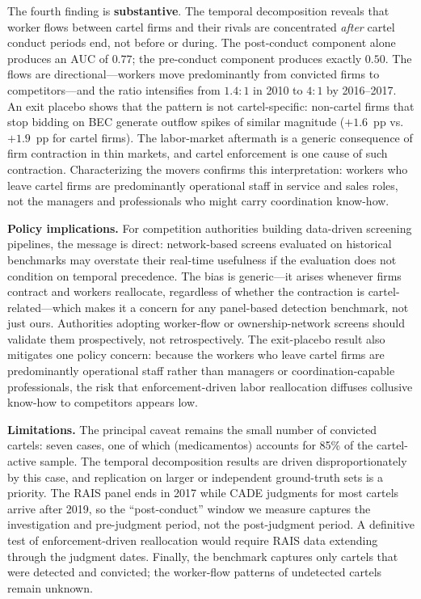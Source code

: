 The fourth finding is \textbf{substantive}. The temporal decomposition reveals that worker flows between cartel firms and their rivals are concentrated \emph{after} cartel conduct periods end, not before or during. The post-conduct component alone produces an AUC of $0.77$; the pre-conduct component produces exactly $0.50$. The flows are directional---workers move predominantly from convicted firms to competitors---and the ratio intensifies from $1.4{:}1$ in 2010 to $4{:}1$ by 2016--2017. An exit placebo shows that the pattern is not cartel-specific: non-cartel firms that stop bidding on BEC generate outflow spikes of similar magnitude ($+1.6$~pp vs.\ $+1.9$~pp for cartel firms). The labor-market aftermath is a generic consequence of firm contraction in thin markets, and cartel enforcement is one cause of such contraction. Characterizing the movers confirms this interpretation: workers who leave cartel firms are predominantly operational staff in service and sales roles, not the managers and professionals who might carry coordination know-how.

\medskip

\noindent\textbf{Policy implications.} For competition authorities building data-driven screening pipelines, the message is direct: network-based screens evaluated on historical benchmarks may overstate their real-time usefulness if the evaluation does not condition on temporal precedence. The bias is generic---it arises whenever firms contract and workers reallocate, regardless of whether the contraction is cartel-related---which makes it a concern for any panel-based detection benchmark, not just ours. Authorities adopting worker-flow or ownership-network screens should validate them prospectively, not retrospectively. The exit-placebo result also mitigates one policy concern: because the workers who leave cartel firms are predominantly operational staff rather than managers or coordination-capable professionals, the risk that enforcement-driven labor reallocation diffuses collusive know-how to competitors appears low.

\noindent\textbf{Limitations.} The principal caveat remains the small number of convicted cartels: seven cases, one of which (medicamentos) accounts for 85\% of the cartel-active sample. The temporal decomposition results are driven disproportionately by this case, and replication on larger or independent ground-truth sets is a priority. The RAIS panel ends in 2017 while CADE judgments for most cartels arrive after 2019, so the ``post-conduct'' window we measure captures the investigation and pre-judgment period, not the post-judgment period. A definitive test of enforcement-driven reallocation would require RAIS data extending through the judgment dates. Finally, the benchmark captures only cartels that were detected and convicted; the worker-flow patterns of undetected cartels remain unknown.

